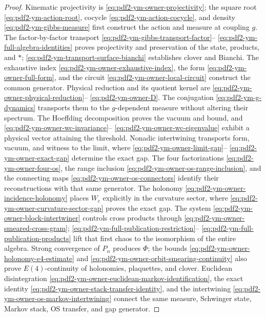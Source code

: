 \begin{proof}
Kinematic projectivity is \eqref{eq:pdf2-ym-owner-projectivity}; the square root
\eqref{eq:pdf2-ym-action-root}, cocycle
\eqref{eq:pdf2-ym-action-cocycle}, and density
\eqref{eq:pdf2-ym-gibbs-measure} first construct the action and measure at
coupling $g$. The factor-by-factor transport
\eqref{eq:pdf2-ym-gibbs-transport-factor}--
\eqref{eq:pdf2-ym-full-algebra-identities} proves projectivity and preservation of the
state, products, and $*$;
\eqref{eq:pdf2-ym-transport-surface-bianchi} establishes clover and Bianchi. The exhaustive index
\eqref{eq:pdf2-ym-owner-exhaustive-index}, the form
\eqref{eq:pdf2-ym-owner-full-form}, and the circuit
\eqref{eq:pdf2-ym-owner-local-circuit} construct the common generator. Physical
reduction and its quotient kernel are
\eqref{eq:pdf2-ym-owner-physical-reduction}--
\eqref{eq:pdf2-ym-owner-D}. The conjugation
\eqref{eq:pdf2-ym-g-dynamics} transports them to the $g$-dependent measure without
altering their spectrum. The Hoeffding decomposition proves the vacuum and bound, and
\eqref{eq:pdf2-ym-owner-wc-invariance}--
\eqref{eq:pdf2-ym-owner-wc-eigenvalue} exhibit a physical vector attaining the
threshold. Nonadic intertwining transports form, vacuum, and witness to the limit, where
\eqref{eq:pdf2-ym-owner-limit-gap}--
\eqref{eq:pdf2-ym-owner-exact-gap} determine the exact gap. The four
factorizations \eqref{eq:pdf2-ym-owner-four-os}, the range inclusion
\eqref{eq:pdf2-ym-owner-os-range-inclusion}, and the connecting maps
\eqref{eq:pdf2-ym-owner-os-connectors} identify their reconstructions with that
same generator. The holonomy
\eqref{eq:pdf2-ym-owner-incidence-holonomy} places $W_c$ explicitly in the curvature
sector, where \eqref{eq:pdf2-ym-owner-curvature-sector-gap} proves the exact
gap. The system \eqref{eq:pdf2-ym-owner-block-intertwiner} controls cross
products through \eqref{eq:pdf2-ym-owner-smeared-cross-gram};
\eqref{eq:pdf2-ym-full-publication-restriction}--
\eqref{eq:pdf2-ym-full-publication-products} lift that first chaos to the isomorphism
of the entire algebra. Strong convergence of $P_\alpha$ produces $\Phi$; the bounds
\eqref{eq:pdf2-ym-owner-holonomy-e4-estimate} and
\eqref{eq:pdf2-ym-owner-orbit-smearing-continuity} also prove
$E(4)$-continuity of holonomies, plaquettes, and clover. Euclidean disintegration
\eqref{eq:pdf2-ym-owner-euclidean-markov-identification}, the exact identity
\eqref{eq:pdf2-ym-owner-stack-transfer-identity}, and the intertwining
\eqref{eq:pdf2-ym-owner-os-markov-intertwining} connect the same measure,
Schwinger state, Markov stack, OS transfer, and gap generator.

\end{proof}
